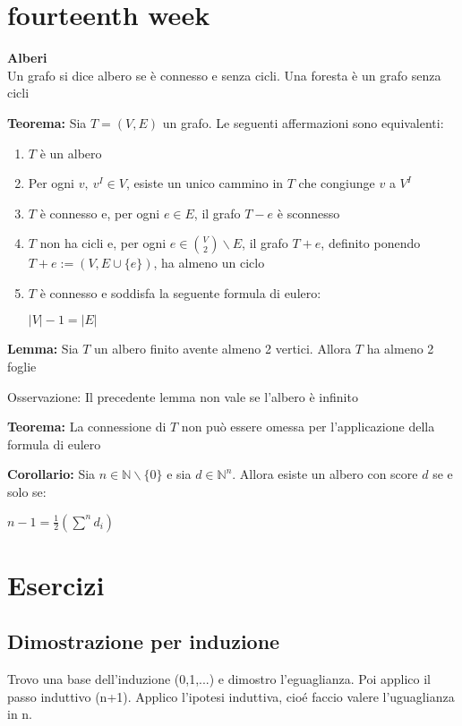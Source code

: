 \documentclass[12pt, a4paper]{article}
\begin{document}
\newpage
\section{fourteenth week}
\textbf{Alberi}\\Un grafo si dice albero se è connesso e senza cicli. Una foresta è un grafo senza cicli

\textbf{Teorema:} Sia $T=(V,E)$ un grafo. Le seguenti affermazioni sono equivalenti:
\begin{enumerate}
    \item $T$ è un albero
    \item Per ogni $v,\ v^{I}\in V$, esiste un unico cammino in $T$ che congiunge $v$ a $V^{I}$
    \item $T$ è connesso e, per ogni $e\in E$, il grafo $T-e$ è sconnesso
    \item $T$ non ha cicli e, per ogni $e\in\binom{V}{2}\backslash E$, il grafo $T+e$, definito ponendo $T+e:=(V,
    E\cup\{e\})$, ha almeno un ciclo
    \item $T$ è connesso e soddisfa la seguente formula di eulero:
    \begin{center}
        $|V|-1=|E|$
    \end{center}
\end{enumerate} 

\textbf{Lemma:} Sia $T$ un albero finito avente almeno 2 vertici. Allora $T$ ha almeno 2 foglie

Osservazione: Il precedente lemma non vale se l'albero è infinito

\textbf{Teorema:} La connessione di $T$ non può essere omessa per l'applicazione della formula di eulero

\textbf{Corollario:} Sia $n\in\mathbb{N}\backslash\{0\}$ e sia $d\in\mathbb{N}^{n}$. Allora esiste un albero con 
score $d$ se e solo se:
\begin{center}
    $n-1=\frac{1}{2}(\sum^{n}d_{i})$
\end{center}

\newpage
\section{Esercizi}
\subsection{Dimostrazione per induzione}
Trovo una base dell'induzione (0,1,...) e dimostro l'eguaglianza. Poi applico il passo induttivo (n+1).
Applico l'ipotesi induttiva, cioé faccio valere l'uguaglianza in n. 
\end{document}
